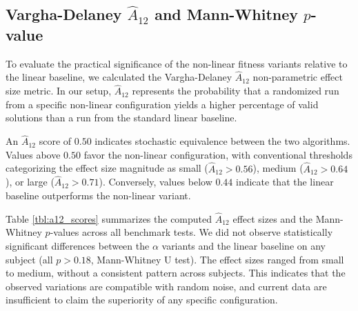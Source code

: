 \documentclass[conference]{IEEEtran}
\begin{document}
\subsection{Vargha-Delaney $\hat{A}_{12}$ and Mann-Whitney $p$-value} \label{sec:stats}
To evaluate the practical significance of the non-linear fitness variants relative to the linear baseline, we calculated the Vargha-Delaney $\hat{A}_{12}$ \cite{vargha2000critique} non-parametric effect size metric. In our setup, $\hat{A}_{12}$ represents the probability that a randomized run from a specific non-linear configuration yields a higher percentage of valid solutions than a run from the standard linear baseline. 

An $\hat{A}_{12}$ score of $0.50$ indicates stochastic equivalence between the two algorithms. Values above $0.50$ favor the non-linear configuration, with conventional thresholds categorizing the effect size magnitude as small ($\hat{A}_{12} > 0.56$), medium ($\hat{A}_{12} > 0.64$), or large ($\hat{A}_{12} > 0.71$). Conversely, values below $0.44$ indicate that the linear baseline outperforms the non-linear variant.

Table \ref{tbl:a12_scores} summarizes the computed $\hat{A}_{12}$ effect sizes and the Mann-Whitney $p$-values \cite{mann1947test} across all benchmark tests.
We did not observe statistically significant differences between the $\alpha$ variants and the linear baseline on any subject (all $p > 0.18$, Mann-Whitney U test). The effect sizes ranged from small to medium, without a consistent pattern across subjects. This indicates that the observed variations are compatible with random noise, and current data are insufficient to claim the superiority of any specific configuration.
\end{document}
